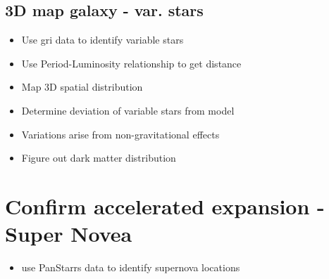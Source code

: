 \documentclass[aps,prl,twocolumn,superscriptaddress]{revtex4-1}
\begin{document}
\subsection{3D map galaxy - var. stars}

\begin{itemize}
	\item{} Use gri data to identify variable stars
	\item{} Use Period-Luminosity relationship to get distance
	\item{} Map 3D spatial distribution
	\item{} Determine deviation of variable stars from model
	\item{} Variations arise from non-gravitational effects
	\item{} Figure out dark matter distribution
\end{itemize}





\section{Confirm accelerated expansion - Super Novea}
\begin{itemize}
	\item{} use PanStarrs data to identify supernova locations
\end{itemize}








\setlength{\parindent}{0cm}

\begin{thebibliography}{99}  %


\end{thebibliography}
\end{document}
